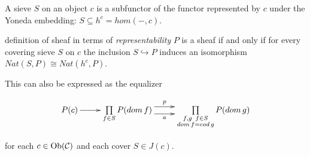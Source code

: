 \begin{frame}
A sieve $S$ on an object $c$ is a subfunctor of the functor represented by $c$ under the Yoneda embedding: $S \subseteq h^c = hom(-,c)$. 
\begin{block}{definition of sheaf in terms of {\it representability}}
$P$ is a sheaf if and only if for every covering sieve $S$ on $c$ the inclusion $S \hookrightarrow P$ induces an isomorphism $Nat(S,P) \cong Nat(h^c,P)$. 
\end{block}
This can also be expressed as the equalizer
\begin{block}{}
\begin{displaymath}
\xymatrix{
P(c) \ar[r]
&
\prod\limits_{f \in S}
P(dom \, f)
\ar@<1ex>[r]^-{p} \ar@<-1ex>[r]_-{a}
&
\prod\limits_{\substack{f,g \,\,\, f \in S \\ dom \, f=cod \, g}}
P(dom \, g)
}
\end{displaymath}
\end{block}
for each $c \in \mathop{\rm Ob}\nolimits({\mathcal C})$ and each cover $S \in J(c)$.
\end{frame}